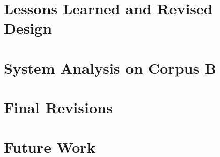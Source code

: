 \documentclass[11pt,letterpaper]{article}
\begin{document}
\section{Lessons Learned and Revised Design}

\section{System Analysis on Corpus B}

\section{Final Revisions}

\section{Future Work}







\label{lastpage}
\end{document}

